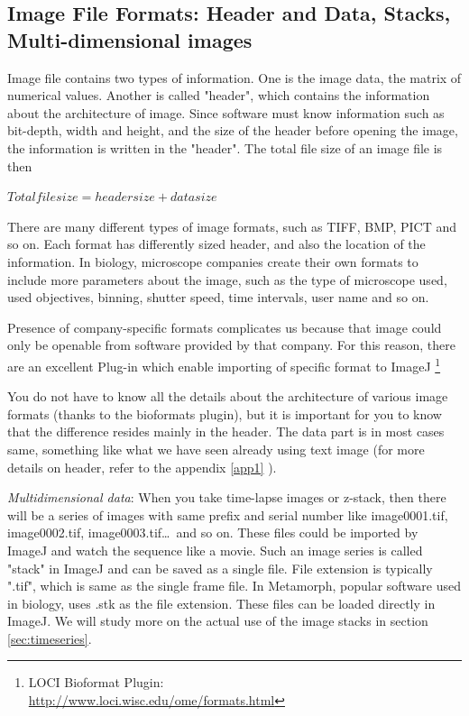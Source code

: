\subsection{Image File Formats: Header and Data, Stacks, Multi-dimensional images}

Image file contains two types of information. One is the image data, the matrix of numerical values. Another is called "header", which contains the information about the architecture of image. Since software must know information such as bit-depth, width and height, and the size of the header before opening the image, the information is written in the "header". The total file size of an image file is then 

$Total file size = header size + data size$

There are many different types of image formats, such as TIFF, BMP, PICT and so on. Each format has differently sized header, and also the location of the information. In biology, microscope companies create their own formats to include more parameters about the image, such as the type of microscope used, used objectives, binning, shutter speed, time intervals, user name and so on. 

Presence of company-specific formats complicates us because that image could only be openable from software provided by that company. For this reason, there are an excellent Plug-in which enable importing of specific format to ImageJ \footnote{\tab LOCI Bioformat Plugin:\\
\url{http://www.loci.wisc.edu/ome/formats.html}}

You do not have to know all the details about the architecture of various image formats (thanks to the bioformats plugin), but it is important for you to know that the difference resides mainly in the header. The data part is in most cases same, something like what we have seen already using text image (for more details on header, refer to the appendix \ref{app1} ). 

\textit{Multidimensional data}: When you take time-lapse images or z-stack, then there will be a series of images with same prefix and serial number like image0001.tif, image0002.tif, image0003.tif\dots\ and so on. These files could be imported by ImageJ and watch the sequence like a movie. Such an image series is called "stack" in ImageJ and can be saved as a single file. File extension is typically ".tif", which is same as the single frame file. In Metamorph, popular software used in biology, uses .stk as the file extension. These files can be loaded directly in ImageJ. We will study more on the actual use of the image stacks in section \ref{sec:timeseries}.

